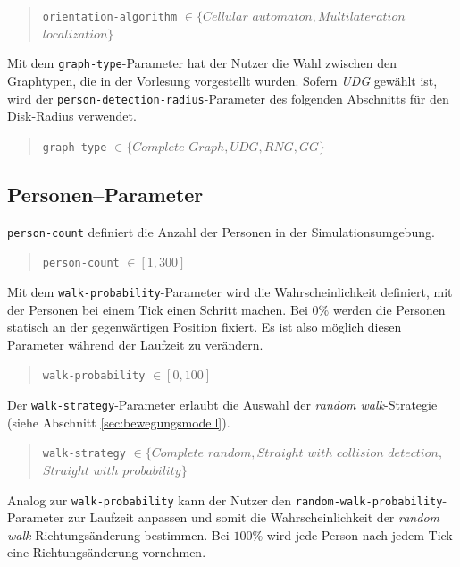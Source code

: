 \begin{quote}
\verb|orientation-algorithm| $\in \{Cellular$ $automaton, Multilateration$ $localization\}$
\end{quote}

Mit dem \verb|graph-type|-Parameter hat der Nutzer die Wahl zwischen den Graphtypen, die in der Vorlesung vorgestellt wurden. Sofern \emph{UDG} gewählt ist, wird der \verb|person-detection-radius|-Parameter des folgenden Abschnitts für den Disk-Radius verwendet.

\begin{quote}
\verb|graph-type| $\in \{Complete$ $Graph, UDG, RNG, GG\}$
\end{quote}

\subsection{Personen--Parameter}
\label{sec:gui_person}

\verb|person-count| definiert die Anzahl der Personen in der Simulationsumgebung.

\begin{quote}
\verb|person-count| $\in [1, 300]$
\end{quote}

Mit dem \verb|walk-probability|-Parameter wird die Wahrscheinlichkeit definiert, mit der Personen bei einem Tick einen Schritt machen. Bei $0 \%$ werden die Personen statisch an der gegenwärtigen Position fixiert. Es ist also möglich diesen Parameter während der Laufzeit zu verändern.  

\begin{quote}
\verb|walk-probability| $\in [0, 100]$
\end{quote}

Der \verb|walk-strategy|-Parameter erlaubt die Auswahl der \emph{random walk}-Strategie (siehe Abschnitt \ref{sec:bewegungsmodell}).

\begin{quote}
\verb|walk-strategy| $\in \{Complete$ $random, Straight$ $with$ $collision$ $detection,$\\\hspace*{3.2cm}$Straight$ $with$ $probability\}$
\end{quote}

Analog zur \verb|walk-probability| kann der Nutzer den \verb|random-walk-probability|-Parameter zur Laufzeit anpassen und somit die Wahrscheinlichkeit der \emph{random walk} Richtungsänderung bestimmen. Bei $100 \%$ wird jede Person nach jedem Tick eine Richtungsänderung vornehmen.

